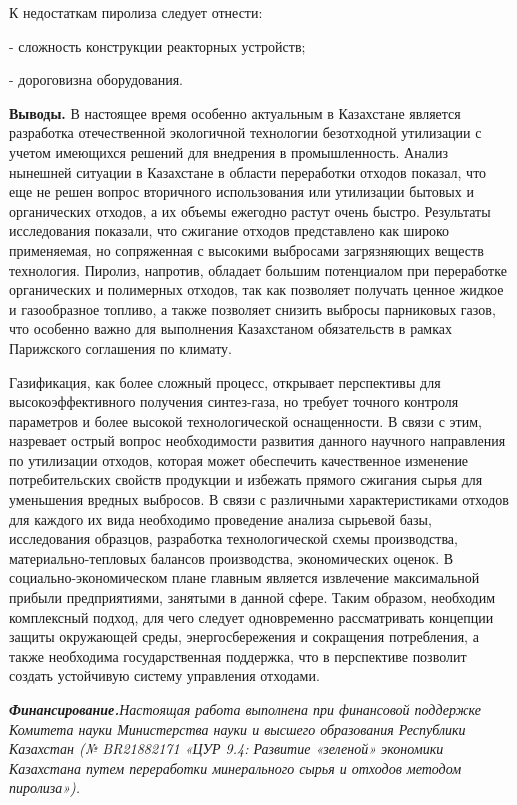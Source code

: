 \begin{multicols}{2}
К недостаткам пиролиза следует отнести:

- сложность конструкции реакторных устройств;

- дороговизна оборудования.

{\bfseries Выводы.} В настоящее время особенно актуальным в Казахстане
является разработка отечественной экологичной технологии безотходной
утилизации с учетом имеющихся решений для внедрения в промышленность.
Анализ нынешней ситуации в Казахстане в области переработки отходов
показал, что еще не решен вопрос вторичного использования или утилизации
бытовых и органических отходов, а их объемы ежегодно растут очень
быстро. Результаты исследования показали, что сжигание отходов
представлено как широко применяемая, но сопряженная с высокими выбросами
загрязняющих веществ технология. Пиролиз, напротив, обладает большим
потенциалом при переработке органических и полимерных отходов, так как
позволяет получать ценное жидкое и газообразное топливо, а также
позволяет снизить выбросы парниковых газов, что особенно важно для
выполнения Казахстаном обязательств в рамках Парижского соглашения по
климату.

Газификация, как более сложный процесс, открывает перспективы для
высокоэффективного получения синтез-газа, но требует точного контроля
параметров и более высокой технологической оснащенности. В связи с этим,
назревает острый вопрос необходимости развития данного научного
направления по утилизации отходов, которая может обеспечить качественное
изменение потребительских свойств продукции и избежать прямого сжигания
сырья для уменьшения вредных выбросов. В связи с различными
характеристиками отходов для каждого их вида необходимо проведение
анализа сырьевой базы, исследования образцов, разработка технологической
схемы производства, материально-тепловых балансов производства,
экономических оценок. В социально-экономическом плане главным является
извлечение максимальной прибыли предприятиями, занятыми в данной сфере.
Таким образом, необходим комплексный подход, для чего следует
одновременно рассматривать концепции защиты окружающей среды,
энергосбережения и сокращения потребления, а также необходима
государственная поддержка, что в перспективе позволит создать устойчивую
систему управления отходами.

\emph{{\bfseries Финансирование.}Настоящая работа выполнена при финансовой
поддержке Комитета науки Министерства науки и высшего образования
Республики Казахстан (№ BR21882171 «ЦУР 9.4: Развитие «зеленой»
экономики Казахстана путем переработки минерального сырья и отходов
методом пиролиза»).}
\end{multicols}

